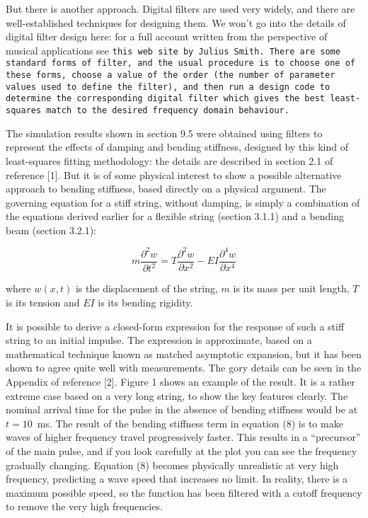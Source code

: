   But there is another approach. Digital filters are used very widely, and 
  there are well-established techniques for designing them. We won't go into 
  the details of digital filter design here: for a full account written from 
  the perspective of musical applications see \tt{}this web site\rm{} by Julius 
  Smith. There are some standard forms of filter, and the usual procedure is to 
  choose one of these forms, choose a value of the order (the number of 
  parameter values used to define the filter), and then run a design code to 
  determine the corresponding digital filter which gives the best least-squares 
  match to the desired frequency domain behaviour. 

  The simulation results shown in section 9.5 were obtained using filters to 
  represent the effects of damping and bending stiffness, designed by this kind 
  of least-squares fitting methodology: the details are described in section 
  2.1 of reference [1]. But it is of some physical interest to show a possible 
  alternative approach to bending stiffness, based directly on a physical 
  argument. The governing equation for a stiff string, without damping, is 
  simply a combination of the equations derived earlier for a flexible string 
  (section 3.1.1) and a bending beam (section 3.2.1): 

  $$m \dfrac{\partial^2 w}{\partial t^2} =T \dfrac{\partial^2 w}{\partial 
  x^2}-EI \dfrac{\partial^4 w}{\partial x^4} \tag{8}$$ 

  where $w(x,t)$ is the displacement of the string, $m$ is its mass per unit 
  length, $T$ is its tension and $EI$ is its bending rigidity. 

  It is possible to derive a closed-form expression for the response of such a 
  stiff string to an initial impulse. The expression is approximate, based on a 
  mathematical technique known as matched asymptotic expansion, but it has been 
  shown to agree quite well with measurements. The gory details can be seen in 
  the Appendix of reference [2]. Figure 1 shows an example of the result. It is 
  a rather extreme case based on a very long string, to show the key features 
  clearly. The nominal arrival time for the pulse in the absence of bending 
  stiffness would be at $t=10$~ms. The result of the bending stiffness term in 
  equation (8) is to make waves of higher frequency travel progressively 
  faster. This results in a ``precursor'' of the main pulse, and if you look 
  carefully at the plot you can see the frequency gradually changing. Equation 
  (8) becomes physically unrealistic at very high frequency, predicting a wave 
  speed that increases no limit. In reality, there is a maximum possible speed, 
  so the function has been filtered with a cutoff frequency to remove the very 
  high frequencies. 

